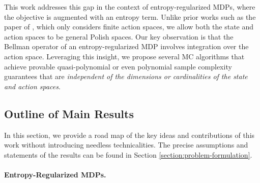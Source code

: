 \documentclass[11pt]{article}
\numberwithin{equation}{section}
\theoremstyle{definition}
\theoremstyle{remark}
\newcommand{\citet}{\cite}
\begin{document}
This work addresses this gap in the context of entropy-regularized MDPs, where the objective is augmented with an entropy term. Unlike prior works such as the paper of \citet{grill2019planning}, which only considers finite action spaces, we allow both the state and action spaces to be general Polish spaces.  
Our key observation is that the Bellman operator of an entropy-regularized MDP involves integration over the action space. Leveraging this insight, we propose several MC algorithms that achieve provable quasi-polynomial or even polynomial 
sample complexity guarantees that are \emph{independent of the dimensions or cardinalities of the state and action spaces}.


\subsection{Outline of Main Results}
\label{subsection:background}


In this section, we provide a road map of the key ideas and
contributions of this work without introducing needless technicalities. The precise assumptions and
statements of the results can be found in Section \ref{section:problem-formulation}.


 
\paragraph{Entropy-Regularized MDPs.}
\end{document}
